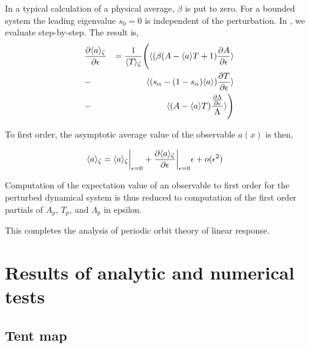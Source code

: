 \documentclass[aps,pre,
                showpacs,
                twocolumn,
                groupedaddress,
                superscriptaddress,
                floatfix]{revtex4-1}
\begin{document}
In a typical calculation of a physical average, $\beta$ is put to zero.
For a bounded system the leading eigenvalue $s_{0}=0$ is independent of
the perturbation. In , we evaluate
 step-by-step. The result is,
\begin{eqnarray*}
&\frac{\partial \langle {a} \rangle_{\zeta}}{\partial \epsilon}
& = \frac{1}{\langle {{\ensuremath{T_{}}}} \rangle_{\zeta}}
        \Bigg(
    \langle {(\beta(A-\langle {a} \rangle T + 1)\frac{\partial A}{\partial\epsilon}} \rangle \\
&-& \langle {(s_{\alpha}-(1-s_{\alpha})\langle {a} \rangle)\frac{\partial T}{\partial\epsilon}} \rangle  \\
&-& \langle {(A-\langle {a} \rangle T) \frac{\frac{\partial\Lambda}{\partial\epsilon}}{\Lambda}} \rangle
        \Bigg)
\end{eqnarray*}

To first order, the asymptotic average value of the observable $a(x)$ is then,

\begin{eqnarray*}
& \langle {a} \rangle_{\zeta} = \langle {a} \rangle_{\zeta} \bigg\rvert_{\epsilon = 0} + \frac{\partial \langle {a} \rangle_{\zeta}}{\partial \epsilon} \bigg\rvert_{\epsilon = 0} \epsilon + o(\epsilon^{2})
\end{eqnarray*}

Computation of the expectation value of an observable to first order for the perturbed dynamical system  is thus reduced to computation of the first order partials of $A_{p}$, $T_{p}$, and $\Lambda_{p}$ in epsilon. 


This completes the analysis of periodic orbit theory of linear response.


\section{Results of analytic and numerical tests}
\label{sect:tests}

\subsection{Tent map}
\label{sect:tentMap}
\end{document}
